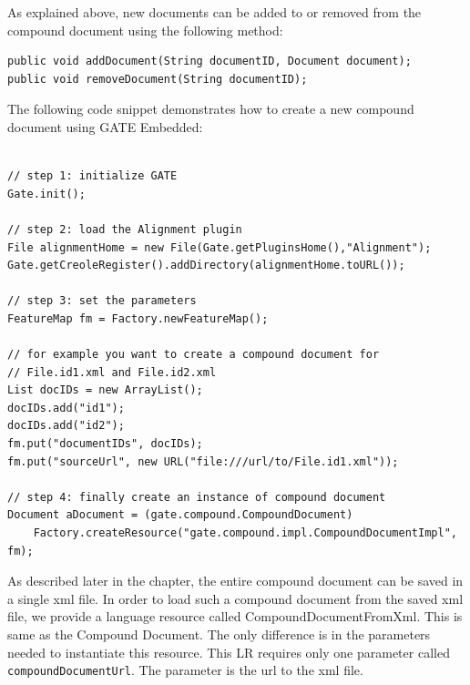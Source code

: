As explained above, new documents can be added to or removed from the
compound document using the following method:

\begin{small}\begin{verbatim}
public void addDocument(String documentID, Document document);
public void removeDocument(String documentID);
\end{verbatim}\end{small}

The following code snippet demonstrates how to create a new compound document
using GATE Embedded:

\begin{lstlisting}

// step 1: initialize GATE 
Gate.init(); 
 
// step 2: load the Alignment plugin 
File alignmentHome = new File(Gate.getPluginsHome(),"Alignment"); 
Gate.getCreoleRegister().addDirectory(alignmentHome.toURL()); 
 
// step 3: set the parameters 
FeatureMap fm = Factory.newFeatureMap(); 
 
// for example you want to create a compound document for 
// File.id1.xml and File.id2.xml 
List docIDs = new ArrayList(); 
docIDs.add("id1"); 
docIDs.add("id2"); 
fm.put("documentIDs", docIDs); 
fm.put("sourceUrl", new URL("file:///url/to/File.id1.xml")); 
 
// step 4: finally create an instance of compound document 
Document aDocument = (gate.compound.CompoundDocument) 
    Factory.createResource("gate.compound.impl.CompoundDocumentImpl", fm);  
\end{lstlisting}


As described later in the chapter, the entire compound document can be saved
in a single xml file.  In order to load such a compound document from the saved
xml file, we provide a language resource called CompoundDocumentFromXml.  This
is same as the Compound Document.  The only difference is in the parameters 
needed to instantiate this resource.  This LR requires only one parameter called
{\tt compoundDocumentUrl}.  The parameter is the url to the xml file.


